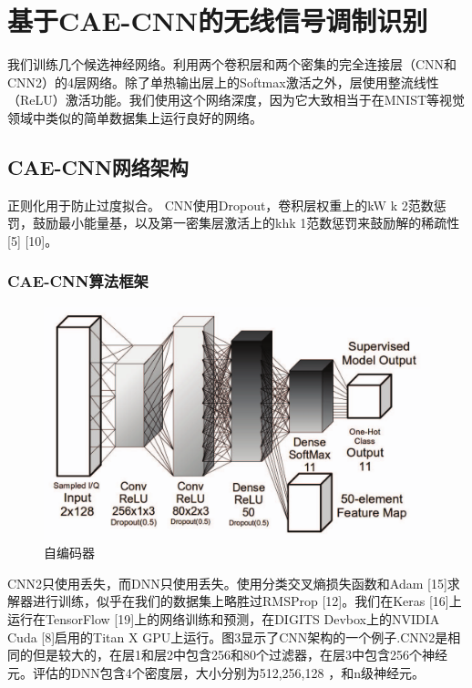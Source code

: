 \section{基于CAE-CNN的无线信号调制识别}
我们训练几个候选神经网络。利用两个卷积层和两个密集的完全连接层（CNN和CNN2）的4层网络。除了单热输出层上的Softmax激活之外，层使用整流线性（ReLU）激活功能。我们使用这个网络深度，因为它大致相当于在MNIST等视觉领域中类似的简单数据集上运行良好的网络。\par 

\subsection{CAE-CNN网络架构}
正则化用于防止过度拟合。 CNN使用Dropout，卷积层权重上的kW k 2范数惩罚，鼓励最小能量基，以及第一密集层激活上的khk 1范数惩罚来鼓励解的稀疏性[5] [10]。 


\subsubsection{CAE-CNN算法框架}

\begin{figure}[!h]
	\centering
	\includegraphics[scale=0.3]{figures/chapter_3/cae_cnn_frame}
	\caption{自编码器}	\label{fig_3_2}
\end{figure}
CNN2只使用丢失，而DNN只使用丢失。使用分类交叉熵损失函数和Adam [15]求解器进行训练，似乎在我们的数据集上略胜过RMSProp [12]。我们在Keras [16]上运行在TensorFlow [19]上的网络训练和预测，在DIGITS Devbox上的NVIDIA Cuda [8]启用的Titan X GPU上运行。图3显示了CNN架构的一个例子.CNN2是相同的但是较大的，在层1和层2中包含256和80个过滤器，在层3中包含256个神经元。评估的DNN包含4个密度层，大小分别为512,256,128 ，和n级神经元。\par

